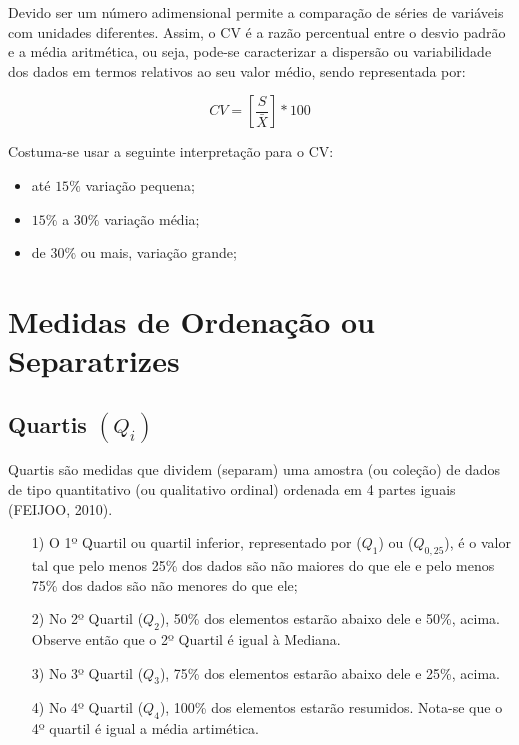 Devido ser um número adimensional permite a comparação de séries de variáveis com unidades diferentes. Assim, o CV é a razão percentual entre o desvio padrão e a média aritmética, ou seja, pode-se caracterizar a dispersão ou variabilidade dos dados em termos relativos ao seu valor médio, sendo representada por:


\begin{equation}\label{CV}
    CV= \left[ \frac{S}{\bar{X}} \right]*100
\end{equation}

Costuma-se usar a seguinte interpretação para o CV:

\begin{itemize}
\item até $15\%$ variação pequena;
\item $15\%$ a $30\%$ variação média;
\item de $30\%$ ou mais, variação grande; 
\end{itemize}

\newpage

\section{Medidas de Ordenação ou Separatrizes}
\subsection{Quartis $(Q_{i})$}






Quartis são medidas que dividem (separam) uma amostra (ou coleção) de dados de tipo quantitativo (ou qualitativo ordinal) ordenada em 4 partes iguais (FEIJOO, 2010).



\begin{enumerate}
  \item[{1)}] O 1º Quartil ou quartil inferior, representado por ($Q_{1}$) ou ($Q_{0,25}$), é o valor tal que pelo menos 25\% dos dados são não maiores do que ele e pelo menos 75\% dos dados são não menores do que ele;


  
  \item[{2)}] No 2º Quartil ($Q_{2}$), 50\% dos elementos estarão abaixo dele e 50\%, acima. Observe então que o 2º Quartil é igual à Mediana.
  \item[{3)}] No 3º Quartil ($Q_{3}$), 75\% dos elementos estarão abaixo dele e 25\%, acima.
  \vskip0.3cm
 \item[{4)}] No 4º Quartil ($Q_{4}$), 100\% dos elementos estarão resumidos. Nota-se que o 4º quartil é igual a média artimética.
\end{enumerate}


